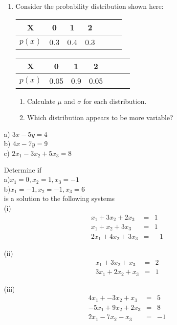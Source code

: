 \begin{enumerate}
\item Consider the probability distribution shown here:

\begin{center}
\begin{tabular}{ccccccc}\hline
X             &0       &1      &2 \\ \hline
$p(x)$        &0.3    &0.4     &0.3 \\ \hline
\end{tabular}
\end{center}

\begin{center}
\begin{tabular}{ccccccc}\hline
X             &0       &1      &2 \\ \hline
$p(x)$        &0.05    &0.9     &0.05 \\ \hline
\end{tabular}
\end{center}

\begin{enumerate}
\item Calculate $\mu$ and $\sigma$ for each distribution.
\item Which distribution appears to be more variable?
\end{enumerate}

\end{enumerate}



\iffalse
a) $3x-5y=4$\\
b) $4x-7y=9$\\
c) $2x_1-3x_2+5x_3=8$

\item Determine if\\ a)$x_1=0,x_2=1,x_3=-1$\\  b)$x_1=-1,x_2=-1,x_3=6$\\ is a solution to the following
systems\\
(i)
$$\begin{array}{rrr}
x_1+3x_2+2x_3&=&1\\
x_1+x_2+3x_3&=&1\\
2x_1+4x_2+3x_3&=&-1
\end{array}$$

(ii)
$$\begin{array}{rrr}
x_1+3x_2+x_3&=&2\\
3x_1+2x_2+x_3&=&1
\end{array}$$

(iii)
$$\begin{array}{rrr}
4x_1+-3x_2+x_3&=&5\\
-5x_1+9x_2+2x_3&=&8\\
2x_1-7x_2-x_3&=&-1
\end{array}$$


